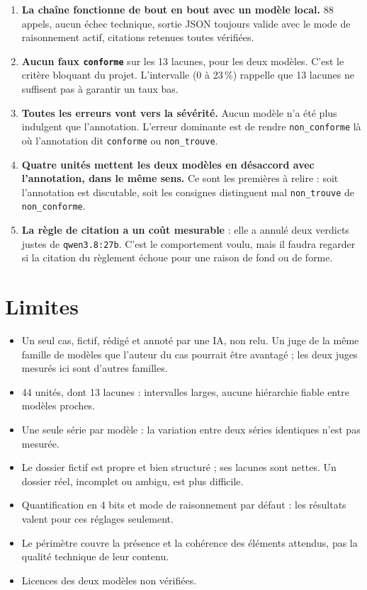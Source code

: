 \documentclass[11pt,a4paper]{article}
\begin{document}
\begin{enumerate}
\item \textbf{La chaîne fonctionne de bout en bout avec un modèle local.}
  88 appels, aucun échec technique, sortie JSON toujours valide avec le
  mode de raisonnement actif, citations retenues toutes vérifiées.
\item \textbf{Aucun faux \texttt{conforme}} sur les 13 lacunes, pour les
  deux modèles. C'est le critère bloquant du projet. L'intervalle (0 à
  23\,\%) rappelle que 13 lacunes ne suffisent pas à garantir un taux bas.
\item \textbf{Toutes les erreurs vont vers la sévérité.} Aucun modèle n'a
  été plus indulgent que l'annotation. L'erreur dominante est de rendre
  \texttt{non\_conforme} là où l'annotation dit \texttt{conforme} ou
  \texttt{non\_trouve}.
\item \textbf{Quatre unités mettent les deux modèles en désaccord avec
  l'annotation, dans le même sens.} Ce sont les premières à relire : soit
  l'annotation est discutable, soit les consignes distinguent mal
  \texttt{non\_trouve} de \texttt{non\_conforme}.
\item \textbf{La règle de citation a un coût mesurable} : elle a annulé
  deux verdicts justes de \texttt{qwen3.8:27b}. C'est le comportement
  voulu, mais il faudra regarder si la citation du règlement échoue pour
  une raison de fond ou de forme.
\end{enumerate}

\section{Limites}

\begin{itemize}
\item Un seul cas, fictif, rédigé et annoté par une IA, non relu. Un juge
  de la même famille de modèles que l'auteur du cas pourrait être avantagé ;
  les deux juges mesurés ici sont d'autres familles.
\item 44 unités, dont 13 lacunes : intervalles larges, aucune hiérarchie
  fiable entre modèles proches.
\item Une seule série par modèle : la variation entre deux séries
  identiques n'est pas mesurée.
\item Le dossier fictif est propre et bien structuré ; ses lacunes sont
  nettes. Un dossier réel, incomplet ou ambigu, est plus difficile.
\item Quantification en 4 bits et mode de raisonnement par défaut : les
  résultats valent pour ces réglages seulement.
\item Le périmètre couvre la présence et la cohérence des éléments
  attendus, pas la qualité technique de leur contenu.
\item Licences des deux modèles non vérifiées.
\end{itemize}
\end{document}
